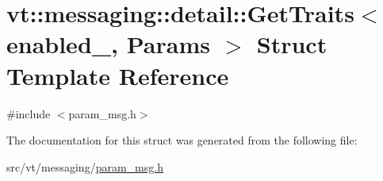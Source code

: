 \hypertarget{structvt_1_1messaging_1_1detail_1_1_get_traits}{}\section{vt\+:\+:messaging\+:\+:detail\+:\+:Get\+Traits$<$ enabled\+\_\+, Params $>$ Struct Template Reference}
\label{structvt_1_1messaging_1_1detail_1_1_get_traits}


{\ttfamily \#include $<$param\+\_\+msg.\+h$>$}



The documentation for this struct was generated from the following file\+:\begin{DoxyCompactItemize}
\item 
src/vt/messaging/\hyperlink{param__msg_8h}{param\+\_\+msg.\+h}\end{DoxyCompactItemize}
